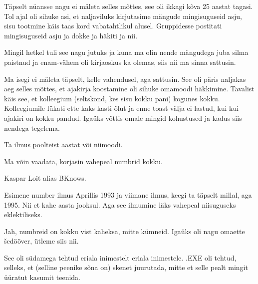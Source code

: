 Täpselt nüansse nagu ei mäleta selles mõttes, see oli ikkagi kõva 25 aastat 
tagasi. Tol ajal oli sihuke asi, et naljaviluks kirjutasime mängude 
mingisuguseid asju, sisu tootmine käis taas kord vabatahtlikul alusel. 
Gruppidesse postitati mingisuguseid asju ja dokke ja häkiti ja nii. 


Mingil hetkel tuli see nagu jutuks ja kuna ma olin nende mängudega juba silma 
paistnud ja enam-vähem oli kirjaoskus ka olemas, siis nii ma sinna sattusin. 

Ma isegi ei mäleta täpselt, kelle vahendusel, aga sattusin. See oli päris 
naljakas aeg selles mõttes, et ajakirja koostamine oli sihuke omamoodi 
häkkimine. Tavalist käis see, et kolleegium (seltskond, kes sisu kokku pani) 
kogunes kokku. Kolleegiumile lükati ette kaks kasti õlut ja enne toast välja ei 
lastud, kui kui ajakiri on kokku pandud. Igaüks võttis omale mingid kohustused 
ja kadus siis nendega tegelema.


Ta ilmus poolteist aastat või niimoodi.


Ma võin vaadata, korjasin vahepeal numbrid kokku.


Kaspar Loit alias BKnows.

Esimene number ilmus Aprillis 1993 ja viimane ilmus, keegi ta täpselt millal, 
aga 1995. Nii et kahe aasta jooksul. Aga see ilmumine läks vahepeal niisuguseks 
eklektiliseks.


Jah, numbreid on kokku vist kaheksa, mitte kümneid. Igaüks oli nagu omaette 
šedööver, ütleme siis nii.


See oli südamega tehtud eriala inimestelt eriala inimestele. .EXE oli tehtud, 
selleks, et (selline peenike sõna on) skenet juurutada, mitte et selle pealt 
mingit üüratut kasumit teenida. 


